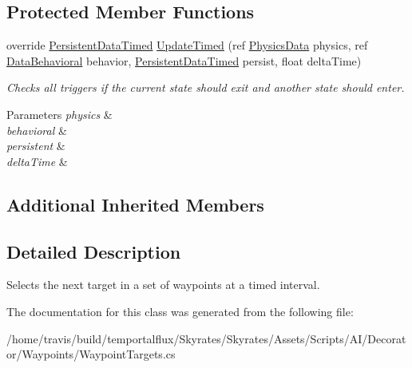 \subsection*{Protected Member Functions}
\begin{DoxyCompactItemize}
\item 
\hypertarget{class_skyrates_1_1_a_i_1_1_target_1_1_waypoint_targets_a69dfb0377fa4446269f0ff068c611a80}{override \hyperlink{class_skyrates_1_1_a_i_1_1_behavior_timed_1_1_persistent_data_timed}{Persistent\-Data\-Timed} \hyperlink{class_skyrates_1_1_a_i_1_1_target_1_1_waypoint_targets_a69dfb0377fa4446269f0ff068c611a80}{Update\-Timed} (ref \hyperlink{class_skyrates_1_1_physics_1_1_physics_data}{Physics\-Data} physics, ref \hyperlink{class_skyrates_1_1_a_i_1_1_behavior_1_1_data_behavioral}{Data\-Behavioral} behavior, \hyperlink{class_skyrates_1_1_a_i_1_1_behavior_timed_1_1_persistent_data_timed}{Persistent\-Data\-Timed} persist, float delta\-Time)}\label{class_skyrates_1_1_a_i_1_1_target_1_1_waypoint_targets_a69dfb0377fa4446269f0ff068c611a80}

\begin{DoxyCompactList}\small\item\em Checks all triggers if the current state should exit and another state should enter. 


\begin{DoxyParams}{Parameters}
{\em physics} & \\
\hline
{\em behavioral} & \\
\hline
{\em persistent} & \\
\hline
{\em delta\-Time} & \\
\hline
\end{DoxyParams}
 \end{DoxyCompactList}\end{DoxyCompactItemize}
\subsection*{Additional Inherited Members}


\subsection{Detailed Description}
Selects the next target in a set of waypoints at a timed interval. 



The documentation for this class was generated from the following file\-:\begin{DoxyCompactItemize}
\item 
/home/travis/build/temportalflux/\-Skyrates/\-Skyrates/\-Assets/\-Scripts/\-A\-I/\-Decorator/\-Waypoints/Waypoint\-Targets.\-cs\end{DoxyCompactItemize}
